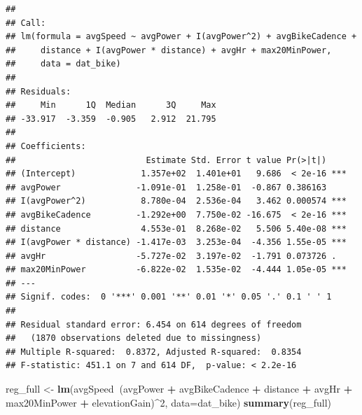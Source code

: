 \documentclass[
]{book}
\newenvironment{Shaded}{\begin{snugshade}}{\end{snugshade}}
\newcommand{\DataTypeTok}[1]{\textcolor[rgb]{0.13,0.29,0.53}{#1}}
\newcommand{\DecValTok}[1]{\textcolor[rgb]{0.00,0.00,0.81}{#1}}
\newcommand{\KeywordTok}[1]{\textcolor[rgb]{0.13,0.29,0.53}{\textbf{#1}}}
\newcommand{\NormalTok}[1]{#1}
\newcommand{\OperatorTok}[1]{\textcolor[rgb]{0.81,0.36,0.00}{\textbf{#1}}}
\newcommand{\StringTok}[1]{\textcolor[rgb]{0.31,0.60,0.02}{#1}}
\begin{document}
\begin{verbatim}
## 
## Call:
## lm(formula = avgSpeed ~ avgPower + I(avgPower^2) + avgBikeCadence + 
##     distance + I(avgPower * distance) + avgHr + max20MinPower, 
##     data = dat_bike)
## 
## Residuals:
##     Min      1Q  Median      3Q     Max 
## -33.917  -3.359  -0.905   2.912  21.795 
## 
## Coefficients:
##                          Estimate Std. Error t value Pr(>|t|)    
## (Intercept)             1.357e+02  1.401e+01   9.686  < 2e-16 ***
## avgPower               -1.091e-01  1.258e-01  -0.867 0.386163    
## I(avgPower^2)           8.780e-04  2.536e-04   3.462 0.000574 ***
## avgBikeCadence         -1.292e+00  7.750e-02 -16.675  < 2e-16 ***
## distance                4.553e-01  8.268e-02   5.506 5.40e-08 ***
## I(avgPower * distance) -1.417e-03  3.253e-04  -4.356 1.55e-05 ***
## avgHr                  -5.727e-02  3.197e-02  -1.791 0.073726 .  
## max20MinPower          -6.822e-02  1.535e-02  -4.444 1.05e-05 ***
## ---
## Signif. codes:  0 '***' 0.001 '**' 0.01 '*' 0.05 '.' 0.1 ' ' 1
## 
## Residual standard error: 6.454 on 614 degrees of freedom
##   (1870 observations deleted due to missingness)
## Multiple R-squared:  0.8372,	Adjusted R-squared:  0.8354 
## F-statistic: 451.1 on 7 and 614 DF,  p-value: < 2.2e-16
\end{verbatim}

\begin{Shaded}
\begin{Highlighting}[]
\NormalTok{reg_full <-}\StringTok{ }\KeywordTok{lm}\NormalTok{(avgSpeed}\OperatorTok{~}\NormalTok{(avgPower }\OperatorTok{+}\StringTok{ }\NormalTok{avgBikeCadence }\OperatorTok{+}\StringTok{ }\NormalTok{distance }\OperatorTok{+}\StringTok{ }\NormalTok{avgHr }\OperatorTok{+}\StringTok{ }\NormalTok{max20MinPower }\OperatorTok{+}\StringTok{ }\NormalTok{elevationGain)}\OperatorTok{^}\DecValTok{2}\NormalTok{, }\DataTypeTok{data=}\NormalTok{dat_bike)}
\KeywordTok{summary}\NormalTok{(reg_full)}
\end{Highlighting}
\end{Shaded}
\end{document}
